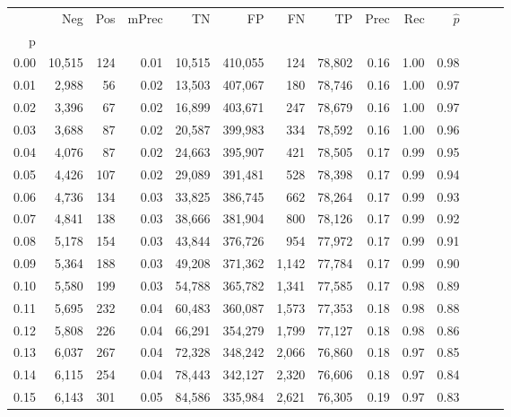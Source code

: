 \begin{tabular}{rrrrrrrrrrrrrr}
\toprule
{} &     Neg &    Pos & mPrec &       TN &       FP &      FN &      TP &  Prec &   Rec & $\hat{p}$ \\
p    &         &        &       &          &          &         &         &       &       &           \\
\midrule
0.00 &  10,515 &    124 &  0.01 &   10,515 &  410,055 &     124 &  78,802 &  0.16 &  1.00 &      0.98 \\
0.01 &   2,988 &     56 &  0.02 &   13,503 &  407,067 &     180 &  78,746 &  0.16 &  1.00 &      0.97 \\
0.02 &   3,396 &     67 &  0.02 &   16,899 &  403,671 &     247 &  78,679 &  0.16 &  1.00 &      0.97 \\
0.03 &   3,688 &     87 &  0.02 &   20,587 &  399,983 &     334 &  78,592 &  0.16 &  1.00 &      0.96 \\
0.04 &   4,076 &     87 &  0.02 &   24,663 &  395,907 &     421 &  78,505 &  0.17 &  0.99 &      0.95 \\
0.05 &   4,426 &    107 &  0.02 &   29,089 &  391,481 &     528 &  78,398 &  0.17 &  0.99 &      0.94 \\
0.06 &   4,736 &    134 &  0.03 &   33,825 &  386,745 &     662 &  78,264 &  0.17 &  0.99 &      0.93 \\
0.07 &   4,841 &    138 &  0.03 &   38,666 &  381,904 &     800 &  78,126 &  0.17 &  0.99 &      0.92 \\
0.08 &   5,178 &    154 &  0.03 &   43,844 &  376,726 &     954 &  77,972 &  0.17 &  0.99 &      0.91 \\
0.09 &   5,364 &    188 &  0.03 &   49,208 &  371,362 &   1,142 &  77,784 &  0.17 &  0.99 &      0.90 \\
0.10 &   5,580 &    199 &  0.03 &   54,788 &  365,782 &   1,341 &  77,585 &  0.17 &  0.98 &      0.89 \\
0.11 &   5,695 &    232 &  0.04 &   60,483 &  360,087 &   1,573 &  77,353 &  0.18 &  0.98 &      0.88 \\
0.12 &   5,808 &    226 &  0.04 &   66,291 &  354,279 &   1,799 &  77,127 &  0.18 &  0.98 &      0.86 \\
0.13 &   6,037 &    267 &  0.04 &   72,328 &  348,242 &   2,066 &  76,860 &  0.18 &  0.97 &      0.85 \\
0.14 &   6,115 &    254 &  0.04 &   78,443 &  342,127 &   2,320 &  76,606 &  0.18 &  0.97 &      0.84 \\
0.15 &   6,143 &    301 &  0.05 &   84,586 &  335,984 &   2,621 &  76,305 &  0.19 &  0.97 &      0.83 \\

\end{tabular}
